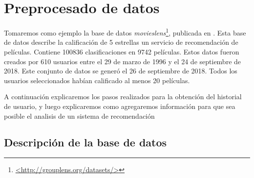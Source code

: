 \section{Preprocesado de datos}

Tomaremos como ejemplo la base de datos \emph{movieslens}\footnote{\url{<http://grouplens.org/datasets/>}}, publicada en \cite{MovieLens}. Esta base de datos describe la calificación de 5 estrellas un servicio de recomendación de películas. Contiene 100836 clasificaciones en 9742 películas. Estos datos fueron creados por 610 usuarios entre el 29 de marzo de 1996 y el 24 de septiembre de 2018. Este conjunto de datos se generó el 26 de septiembre de 2018. Todos los usuarios seleccionados habían calificado al menos 20 películas. 

A continuación explicaremos los pasos realizados para la obtención del historial de usuario, y luego explicaremos como agregaremos información para que sea posible el analisis de un sistema de recomendación


\subsection{Descripción de la base de datos}


